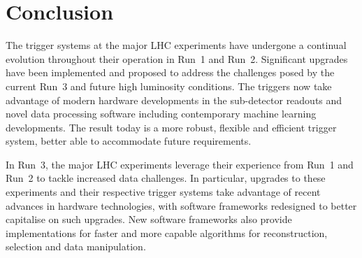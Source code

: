 \section{Conclusion}

The trigger systems at the major LHC experiments have undergone a continual evolution throughout their operation in Run~1 and Run~2. Significant upgrades have been implemented and proposed to address the challenges posed by the current Run~3 and future high luminosity conditions. The triggers now take advantage of modern hardware developments in the sub-detector readouts and novel data processing software including contemporary machine learning developments. The result today is a more robust, flexible and efficient trigger system, better able to accommodate future requirements.

In Run~3, the major LHC experiments leverage their experience from Run~1 and Run~2 to tackle increased data challenges. In particular, upgrades to these experiments and their respective trigger systems take advantage of recent advances in hardware technologies, with software frameworks redesigned to better capitalise on such upgrades. New software frameworks also provide implementations for faster and more capable algorithms for reconstruction, selection and data manipulation.
